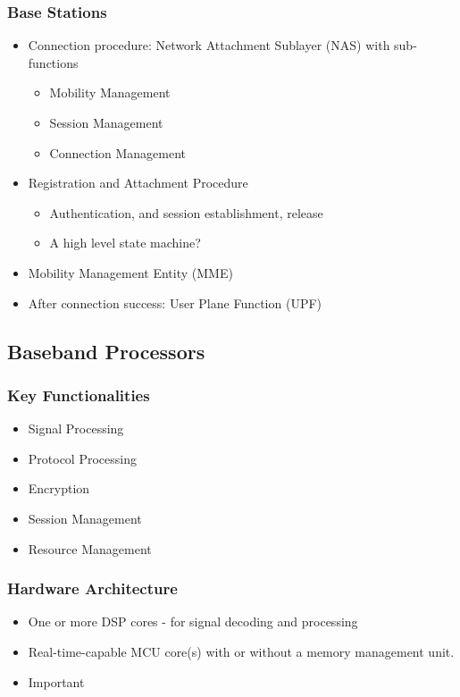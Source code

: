\documentclass[a4paper,11pt,oneside]{report}
\begin{document}
\subsubsection{Base Stations}
\begin{itemize}
  \item Connection procedure: Network Attachment Sublayer (NAS) with sub-functions
    \begin{itemize}
      \item Mobility Management
      \item Session Management
      \item Connection Management
    \end{itemize}
  \item Registration and Attachment Procedure
  \begin{itemize}
    \item Authentication, and session establishment, release
    \item A high level state machine?
  \end{itemize}
  \item Mobility Management Entity (MME)
  \item After connection success: User Plane Function (UPF)
\end{itemize}
  
\subsection{Baseband Processors}

\subsubsection{Key Functionalities}
\begin{itemize}
  \item Signal Processing
  \item Protocol Processing
  \item Encryption 
  \item Session Management
  \item Resource Management
\end{itemize}

\subsubsection{Hardware Architecture}
\begin{itemize}
  \item One or more DSP cores - for signal decoding and processing
  \item Real-time-capable MCU core(s) with or without a memory management unit.
  \item Important 
\end{itemize}
\end{document}
